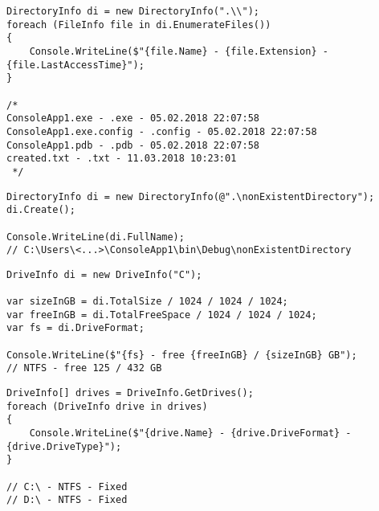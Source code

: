 \begin{frame}[fragile]
\begin{yesblock}
\begin{lstlisting}
DirectoryInfo di = new DirectoryInfo(".\\");
foreach (FileInfo file in di.EnumerateFiles())
{
    Console.WriteLine($"{file.Name} - {file.Extension} - {file.LastAccessTime}");
}

/*
ConsoleApp1.exe - .exe - 05.02.2018 22:07:58
ConsoleApp1.exe.config - .config - 05.02.2018 22:07:58
ConsoleApp1.pdb - .pdb - 05.02.2018 22:07:58
created.txt - .txt - 11.03.2018 10:23:01
 */
\end{lstlisting}
\end{yesblock}
\vfill
\begin{yesblock}
\begin{lstlisting}
DirectoryInfo di = new DirectoryInfo(@".\nonExistentDirectory");
di.Create();

Console.WriteLine(di.FullName);
// C:\Users\<...>\ConsoleApp1\bin\Debug\nonExistentDirectory
\end{lstlisting}
\end{yesblock}
\end{frame}



\begin{frame}[fragile]
\begin{yesblock}
\begin{lstlisting}
DriveInfo di = new DriveInfo("C");

var sizeInGB = di.TotalSize / 1024 / 1024 / 1024;
var freeInGB = di.TotalFreeSpace / 1024 / 1024 / 1024;
var fs = di.DriveFormat;

Console.WriteLine($"{fs} - free {freeInGB} / {sizeInGB} GB");
// NTFS - free 125 / 432 GB
\end{lstlisting}
\end{yesblock}
\vfill
\begin{yesblock}
\begin{lstlisting}
DriveInfo[] drives = DriveInfo.GetDrives();
foreach (DriveInfo drive in drives)
{
    Console.WriteLine($"{drive.Name} - {drive.DriveFormat} - {drive.DriveType}");
}

// C:\ - NTFS - Fixed
// D:\ - NTFS - Fixed
\end{lstlisting}
\end{yesblock}
\end{frame}








